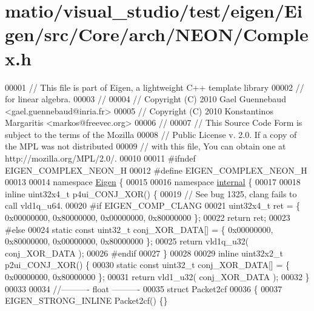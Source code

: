 \hypertarget{matio_2visual__studio_2test_2eigen_2_eigen_2src_2_core_2arch_2_n_e_o_n_2_complex_8h_source}{}\section{matio/visual\+\_\+studio/test/eigen/\+Eigen/src/\+Core/arch/\+N\+E\+O\+N/\+Complex.h}
\label{matio_2visual__studio_2test_2eigen_2_eigen_2src_2_core_2arch_2_n_e_o_n_2_complex_8h_source}

\begin{DoxyCode}
00001 \textcolor{comment}{// This file is part of Eigen, a lightweight C++ template library}
00002 \textcolor{comment}{// for linear algebra.}
00003 \textcolor{comment}{//}
00004 \textcolor{comment}{// Copyright (C) 2010 Gael Guennebaud <gael.guennebaud@inria.fr>}
00005 \textcolor{comment}{// Copyright (C) 2010 Konstantinos Margaritis <markos@freevec.org>}
00006 \textcolor{comment}{//}
00007 \textcolor{comment}{// This Source Code Form is subject to the terms of the Mozilla}
00008 \textcolor{comment}{// Public License v. 2.0. If a copy of the MPL was not distributed}
00009 \textcolor{comment}{// with this file, You can obtain one at http://mozilla.org/MPL/2.0/.}
00010 
00011 \textcolor{preprocessor}{#ifndef EIGEN\_COMPLEX\_NEON\_H}
00012 \textcolor{preprocessor}{#define EIGEN\_COMPLEX\_NEON\_H}
00013 
00014 \textcolor{keyword}{namespace }\hyperlink{namespace_eigen}{Eigen} \{
00015 
00016 \textcolor{keyword}{namespace }\hyperlink{namespaceinternal}{internal} \{
00017 
00018 \textcolor{keyword}{inline} uint32x4\_t p4ui\_CONJ\_XOR() \{
00019 \textcolor{comment}{// See bug 1325, clang fails to call vld1q\_u64.}
00020 \textcolor{preprocessor}{#if EIGEN\_COMP\_CLANG}
00021   uint32x4\_t ret = \{ 0x00000000, 0x80000000, 0x00000000, 0x80000000 \};
00022   \textcolor{keywordflow}{return} ret;
00023 \textcolor{preprocessor}{#else}
00024   \textcolor{keyword}{static} \textcolor{keyword}{const} uint32\_t conj\_XOR\_DATA[] = \{ 0x00000000, 0x80000000, 0x00000000, 0x80000000 \};
00025   \textcolor{keywordflow}{return} vld1q\_u32( conj\_XOR\_DATA );
00026 \textcolor{preprocessor}{#endif}
00027 \}
00028 
00029 \textcolor{keyword}{inline} uint32x2\_t p2ui\_CONJ\_XOR() \{
00030   \textcolor{keyword}{static} \textcolor{keyword}{const} uint32\_t conj\_XOR\_DATA[] = \{ 0x00000000, 0x80000000 \};
00031   \textcolor{keywordflow}{return} vld1\_u32( conj\_XOR\_DATA );
00032 \}
00033 
00034 \textcolor{comment}{//---------- float ----------}
00035 \textcolor{keyword}{struct }Packet2cf
00036 \{
00037   EIGEN\_STRONG\_INLINE Packet2cf() \{\}

\end{DoxyCode}
